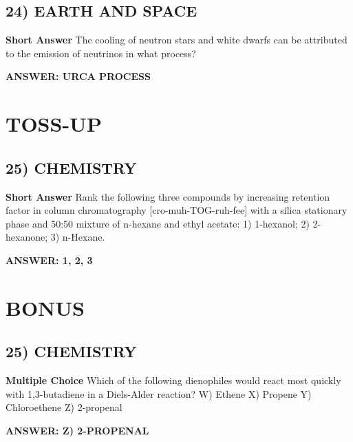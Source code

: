 \documentclass{article}
\begin{document}
\subsection*{24) EARTH AND SPACE}
\textbf{Short Answer} The cooling of neutron stars and white dwarfs can be attributed to the emission of neutrinos in what process?

\textbf{ANSWER: URCA PROCESS}

\section*{TOSS-UP}
\subsection*{25) CHEMISTRY}
\textbf{Short Answer} Rank the following three compounds by increasing retention factor in column chromatography [cro-muh-TOG-ruh-fee] with a silica stationary phase and 50:50 mixture of n-hexane and ethyl acetate: 1) 1-hexanol; 2) 2-hexanone; 3) n-Hexane.

\textbf{ANSWER: 1, 2, 3}

\section*{BONUS}
\subsection*{25) CHEMISTRY}
\textbf{Multiple Choice} Which of the following dienophiles would react most quickly with 1,3-butadiene in a Diels-Alder reaction?
W) Ethene
X) Propene
Y) Chloroethene
Z) 2-propenal

\textbf{ANSWER: Z) 2-PROPENAL}
\end{document}
